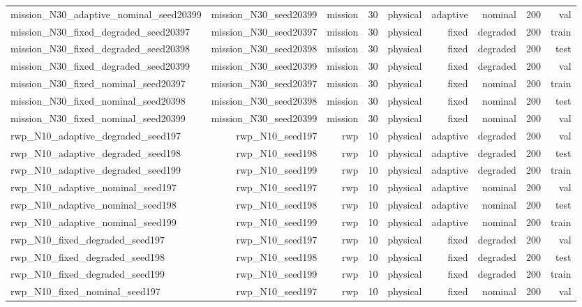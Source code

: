 \begin{tabular}{lrrrrrrrr}
mission\_N30\_adaptive\_nominal\_seed20399 & mission\_N30\_seed20399 & mission & 30 & physical & adaptive & nominal & 200 & val \\
mission\_N30\_fixed\_degraded\_seed20397 & mission\_N30\_seed20397 & mission & 30 & physical & fixed & degraded & 200 & train \\
mission\_N30\_fixed\_degraded\_seed20398 & mission\_N30\_seed20398 & mission & 30 & physical & fixed & degraded & 200 & test \\
mission\_N30\_fixed\_degraded\_seed20399 & mission\_N30\_seed20399 & mission & 30 & physical & fixed & degraded & 200 & val \\
mission\_N30\_fixed\_nominal\_seed20397 & mission\_N30\_seed20397 & mission & 30 & physical & fixed & nominal & 200 & train \\
mission\_N30\_fixed\_nominal\_seed20398 & mission\_N30\_seed20398 & mission & 30 & physical & fixed & nominal & 200 & test \\
mission\_N30\_fixed\_nominal\_seed20399 & mission\_N30\_seed20399 & mission & 30 & physical & fixed & nominal & 200 & val \\
rwp\_N10\_adaptive\_degraded\_seed197 & rwp\_N10\_seed197 & rwp & 10 & physical & adaptive & degraded & 200 & val \\
rwp\_N10\_adaptive\_degraded\_seed198 & rwp\_N10\_seed198 & rwp & 10 & physical & adaptive & degraded & 200 & test \\
rwp\_N10\_adaptive\_degraded\_seed199 & rwp\_N10\_seed199 & rwp & 10 & physical & adaptive & degraded & 200 & train \\
rwp\_N10\_adaptive\_nominal\_seed197 & rwp\_N10\_seed197 & rwp & 10 & physical & adaptive & nominal & 200 & val \\
rwp\_N10\_adaptive\_nominal\_seed198 & rwp\_N10\_seed198 & rwp & 10 & physical & adaptive & nominal & 200 & test \\
rwp\_N10\_adaptive\_nominal\_seed199 & rwp\_N10\_seed199 & rwp & 10 & physical & adaptive & nominal & 200 & train \\
rwp\_N10\_fixed\_degraded\_seed197 & rwp\_N10\_seed197 & rwp & 10 & physical & fixed & degraded & 200 & val \\
rwp\_N10\_fixed\_degraded\_seed198 & rwp\_N10\_seed198 & rwp & 10 & physical & fixed & degraded & 200 & test \\
rwp\_N10\_fixed\_degraded\_seed199 & rwp\_N10\_seed199 & rwp & 10 & physical & fixed & degraded & 200 & train \\
rwp\_N10\_fixed\_nominal\_seed197 & rwp\_N10\_seed197 & rwp & 10 & physical & fixed & nominal & 200 & val \\

\end{tabular}
